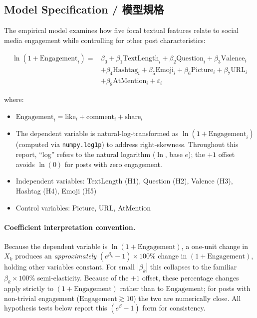 \documentclass[12pt,a4paper,fontset=none]{ctexart}
\begin{document}
\subsection{Model Specification / 模型規格}

The empirical model examines how five focal textual features relate to social media engagement while controlling for other post characteristics:

\begin{equation}
\begin{aligned}
\ln(1 + \text{Engagement}_i) = {}& \beta_0 + \beta_1\text{TextLength}_i + \beta_2\text{Question}_i + \beta_3\text{Valence}_i \\
& + \beta_4\text{Hashtag}_i + \beta_5\text{Emoji}_i + \beta_6\text{Picture}_i + \beta_7\text{URL}_i \\
& + \beta_8\text{AtMention}_i + \varepsilon_i
\end{aligned}
\end{equation}

where:
\begin{itemize}
    \item $\text{Engagement}_i = \text{like}_i + \text{comment}_i + \text{share}_i$
    \item The dependent variable is natural-log-transformed as $\ln(1 + \text{Engagement}_i)$ (computed via \texttt{numpy.log1p}) to address right-skewness. Throughout this report, ``log'' refers to the natural logarithm ($\ln$, base $e$); the $+1$ offset avoids $\ln(0)$ for posts with zero engagement.
    \item Independent variables: TextLength (H1), Question (H2), Valence (H3), Hashtag (H4), Emoji (H5)
    \item Control variables: Picture, URL, AtMention
\end{itemize}

\paragraph{Coefficient interpretation convention.} Because the dependent variable is $\ln(1+\text{Engagement})$, a one-unit change in $X_k$ produces an \emph{approximately} $(e^{\beta_k}-1)\times 100\%$ change in $(1+\text{Engagement})$, holding other variables constant. For small $|\beta_k|$ this collapses to the familiar $\beta_k \times 100\%$ semi-elasticity. Because of the $+1$ offset, these percentage changes apply strictly to $(1+\text{Engagement})$ rather than to $\text{Engagement}$; for posts with non-trivial engagement ($\text{Engagement} \gtrsim 10$) the two are numerically close. All hypothesis tests below report this $(e^{\beta}-1)$ form for consistency.
\end{document}
